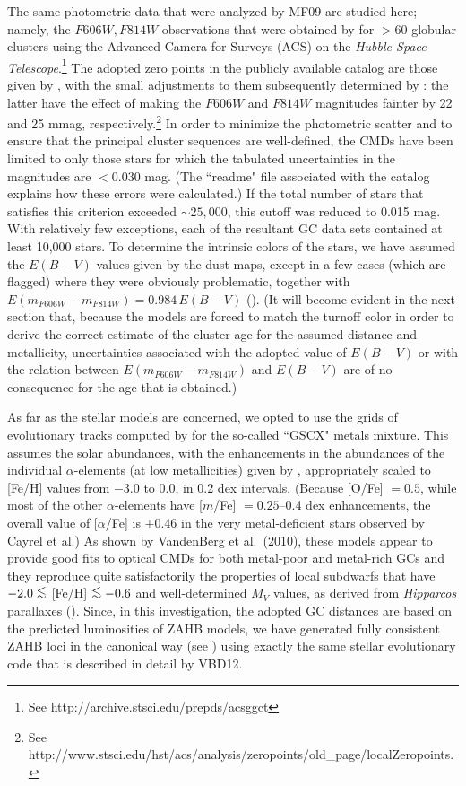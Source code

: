 \documentclass[12pt,preprint]{aastex}
\newcommand\lta{\mathrel{\hbox{\raise 0.6 ex \hbox{$<$}\kern
                   -1.8 ex\lower .5 ex\hbox{$\sim$}}}}
\begin{document}
The same photometric data that were analyzed by MF09 are studied here; namely,
the $F606W, F814W$ observations that were obtained by \citet{sbc07} for $> 60$
globular clusters using the Advanced Camera for Surveys (ACS) on the {\it
Hubble Space Telescope}.\footnote{See http://archive.stsci.edu/prepds/acsggct}
The adopted zero points in the publicly available catalog are those given by
\citet{sjb05}, with the small adjustments to them subsequently determined by
\citet{bo07}: the latter have the effect of making the $F606W$ and $F814W$
magnitudes fainter by 22 and 25 mmag, respectively.\footnote{See
http://www.stsci.edu/hst/acs/analysis/zeropoints/old\_page/localZeropoints.}
In order to minimize the photometric scatter and to ensure that the principal
cluster sequences are well-defined, the CMDs have been limited to only those
stars for which the tabulated uncertainties in the magnitudes are $< 0.030$ mag.
(The ``readme" file associated with the catalog explains how these errors were
calculated.)  If the total number of stars that satisfies this criterion
exceeded $\sim 25,000$, this cutoff was reduced to 0.015 mag.  With relatively
few exceptions, each of the resultant GC data sets contained at least 10,000
stars.  To determine the intrinsic colors of the stars, we have assumed the
$E(B-V)$ values given by the \citet{sfd98} dust maps, except in a few cases
(which are flagged) where they were obviously problematic, together with
$E(m_{F606W}-m_{F814W}) = 0.984\,E(B-V)$ (\citealt{sjb05}).  (It will become
evident in the next section that, because the models are forced to match the
turnoff color in order to derive the correct estimate of the cluster age for
the assumed distance and metallicity, uncertainties associated with the adopted
value of $E(B-V)$ or with the relation between $E(m_{F606W}-m_{F814W})$ and
$E(B-V)$ are of no consequence for the age that is obtained.)

As far as the stellar models are concerned, we opted to use the grids of
evolutionary tracks computed by \citet[hereafter VBD12]{vbd12} for the
so-called ``GSCX" metals mixture.  This assumes the \citet{gs98} solar
abundances, with the enhancements in the abundances of the individual
$\alpha$-elements (at low metallicities) given by \citet{cds04}, appropriately
scaled to [Fe/H] values from $-3.0$ to 0.0, in 0.2 dex intervals.  (Because
[O/Fe] $= 0.5$, while most of the other $\alpha$-elements have [$m$/Fe]
$= 0.25$--0.4 dex enhancements, the overall value of [$\alpha$/Fe] is $+0.46$
in the very metal-deficient stars observed by Cayrel et al.)  As shown by
VandenBerg et al.~(2010), these models appear to provide good fits to optical
CMDs for both metal-poor and metal-rich GCs and they reproduce quite
satisfactorily the properties of local subdwarfs that have $-2.0 \lta$ [Fe/H]
$\lta -0.6$ and well-determined $M_V$ values, as derived from {\it Hipparcos}
parallaxes (\citealt{vl07}).  Since, in this investigation, the adopted GC
distances are based on the predicted luminosities of ZAHB models, we have
generated fully consistent ZAHB loci in the canonical way (see \citealt{vsr00})
using exactly the same stellar evolutionary code that is described in detail by
VBD12.
\end{document}
